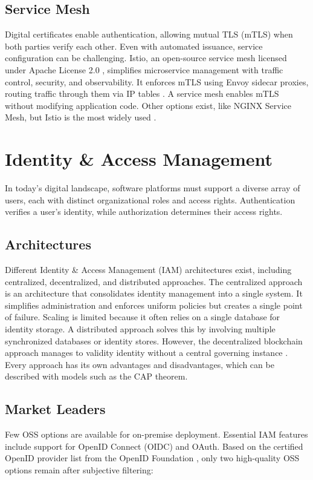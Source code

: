 \subsection{Service Mesh}
Digital certificates enable authentication, allowing mutual TLS (mTLS) when both parties verify each other. Even with automated issuance, service configuration can be challenging. Istio, an open-source service mesh licensed under Apache License 2.0 \Parencite{istio_license}, simplifies microservice management with traffic control, security, and observability. It enforces mTLS using Envoy sidecar proxies, routing traffic through them via IP tables \Parencite{istio_architecture}. A service mesh enables mTLS without modifying application code. Other options exist, like NGINX Service Mesh, but Istio is the most widely used \Parencite{toptal_service_mesh}.

\section{Identity \& Access Management}
In today's digital landscape, software platforms must support a diverse array of users, each with distinct organizational roles and access rights. Authentication verifies a user's identity, while authorization determines their access rights.

\subsection{Architectures}
Different Identity \& Access Management (IAM) architectures exist, including centralized, decentralized, and distributed approaches. The centralized approach is an architecture that consolidates identity management into a single system. It simplifies administration and enforces uniform policies but creates a single point of failure. Scaling is limited because it often relies on a single database for identity storage. A distributed approach solves this by involving multiple synchronized databases or identity stores. However, the decentralized blockchain approach manages to validity identity without a central governing instance \Parencite{geeksforgeeks2025}. Every approach has its own advantages and disadvantages, which can be described with models such as the CAP theorem. 

\subsection{Market Leaders}
Few OSS options are available for on-premise deployment. Essential IAM features include support for OpenID Connect (OIDC) and OAuth. Based on the certified OpenID provider list from the OpenID Foundation \parencite{openidImplementations}, only two high-quality OSS options remain after subjective filtering:


